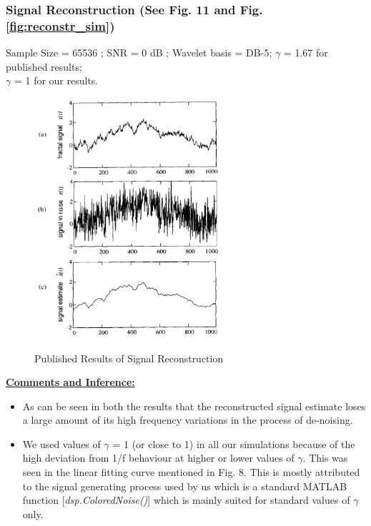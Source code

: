 \documentclass[a4paper]{article}
\begin{document}
\subsubsection{Signal Reconstruction (See Fig. 11 and Fig. \ref{fig:reconstr_sim})}
Sample Size = 65536 ; SNR = 0 dB ; Wavelet basis = DB-5; $\gamma$ = 1.67 for published results; \\$\gamma$ = 1 for our results.

\begin{figure}
\vspace{-20pt}
\includegraphics[width=7cm]{reconst.png}
\label{fig:reconst}
\caption{Published Results of Signal Reconstruction}
\vspace{-180pt}
\end{figure}
\underline{\textbf{Comments and Inference:}}
\begin{itemize}
\item As can be seen in both the results that the reconstructed signal estimate loses a large amount of its high frequency variations in the process of de-noising.
\item We used values of $\gamma$ = 1 (or close to 1) in all our simulations because of the high deviation from 1/f behaviour at higher or lower values of $\gamma$. This was seen in the linear fitting curve mentioned in Fig. 8. This is mostly attributed to the signal generating process used by us which is a standard MATLAB function [\textit{dsp.ColoredNoise()}] which is mainly suited for standard values of $\gamma$ only.
\end{itemize}
\vspace{4 cm}
\end{document}
